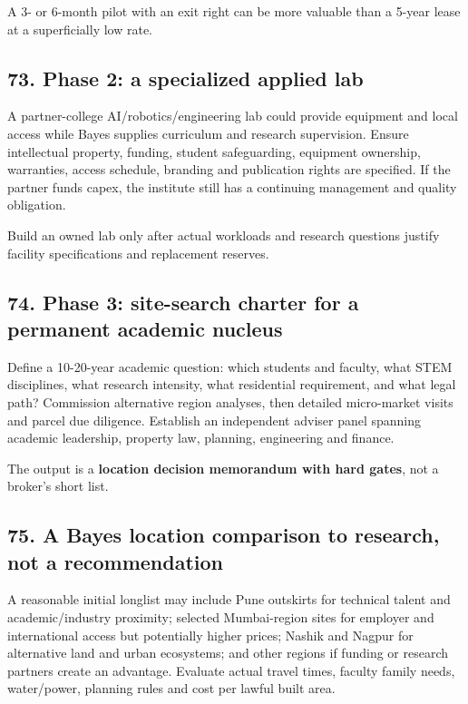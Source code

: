 A 3- or 6-month pilot with an exit right can be more valuable than a 5-year lease at a superficially low rate.


\subsection{73. Phase 2: a specialized applied lab}

A partner-college AI/robotics/engineering lab could provide equipment and local access while Bayes supplies curriculum and research supervision. Ensure intellectual property, funding, student safeguarding, equipment ownership, warranties, access schedule, branding and publication rights are specified. If the partner funds capex, the institute still has a continuing management and quality obligation.

Build an owned lab only after actual workloads and research questions justify facility specifications and replacement reserves.


\subsection{74. Phase 3: site-search charter for a permanent academic nucleus}

Define a 10-20-year academic question: which students and faculty, what STEM disciplines, what research intensity, what residential requirement, and what legal path? Commission alternative region analyses, then detailed micro-market visits and parcel due diligence. Establish an independent adviser panel spanning academic leadership, property law, planning, engineering and finance.

The output is a \textbf{location decision memorandum with hard gates}, not a broker's short list.


\subsection{75. A Bayes location comparison to research, not a recommendation}

A reasonable initial longlist may include Pune outskirts for technical talent and academic/industry proximity; selected Mumbai-region sites for employer and international access but potentially higher prices; Nashik and Nagpur for alternative land and urban ecosystems; and other regions if funding or research partners create an advantage. Evaluate actual travel times, faculty family needs, water/power, planning rules and cost per lawful built area.

